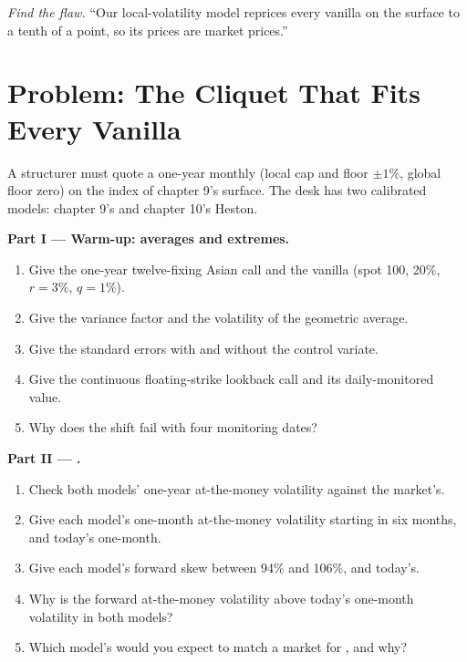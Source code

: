 \begin{exercise}[$\star\star\star$]\label{exo:dv:asians-lookbacks-cliquets-and-forward-starts:8}
\emph{Find the flaw.} ``Our local-volatility model reprices every vanilla on the surface to a tenth of a point, so its 
prices are market prices.''
\end{exercise}

\section{Problem: The Cliquet That Fits Every Vanilla}

\begin{problem}\label{pb:dv:asians-lookbacks-cliquets-and-forward-starts:1}
A structurer must quote a one-year monthly  (local cap and floor $\pm1\%$, global floor zero) on the index of
chapter 9's surface. The desk has two calibrated models: chapter 9's  and chapter 10's Heston.

\medskip\noindent\textbf{Part I --- Warm-up: averages and extremes.}
\begin{enumerate}
\item Give the one-year twelve-fixing Asian call and the vanilla (spot 100, 20\%, $r=3\%$, $q=1\%$).
\item Give the variance factor and the volatility of the geometric average.
\item Give the standard errors with and without the control variate.
\item Give the continuous floating-strike lookback call and its daily-monitored value.
\item Why does the shift fail with four monitoring dates?
\end{enumerate}

\medskip\noindent\textbf{Part II --- .}
\begin{enumerate}[resume]
\item Check both models' one-year at-the-money volatility against the market's.
\item Give each model's one-month at-the-money volatility starting in six months, and today's one-month.
\item Give each model's forward skew between 94\% and 106\%, and today's.
\item Why is the forward at-the-money volatility above today's one-month volatility in both models?
\item Which model's  would you expect to match a market for , and why?
\end{enumerate}


\end{problem}
